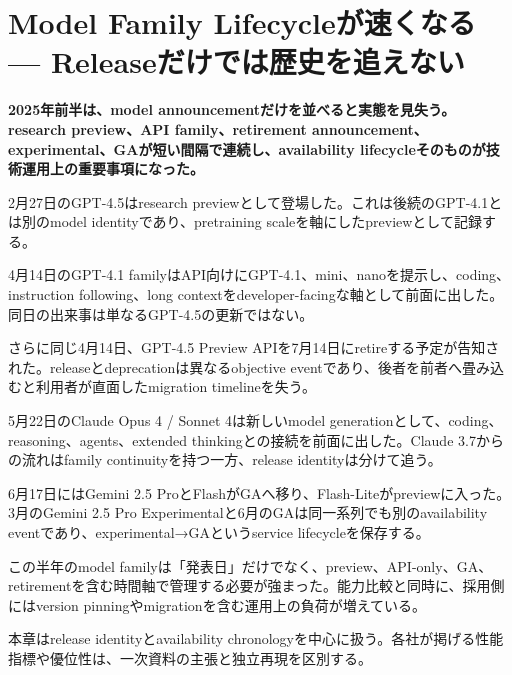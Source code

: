 \section{Model Family Lifecycleが速くなる — Releaseだけでは歴史を追えない}
\label{pkg:lifecycle}
\noindent\textbf{2025年前半は、model announcementだけを並べると実態を見失う。research preview、API family、retirement announcement、experimental、GAが短い間隔で連続し、availability lifecycleそのものが技術運用上の重要事項になった。}\autocite{src-31799a46d8d0,src-3fa7f4cd510b,src-53f15d483a2d}

2月27日のGPT-4.5はresearch previewとして登場した。これは後続のGPT-4.1とは別のmodel identityであり、pretraining scaleを軸にしたpreviewとして記録する。\autocite{src-3fa7f4cd510b}


4月14日のGPT-4.1 familyはAPI向けにGPT-4.1、mini、nanoを提示し、coding、instruction following、long contextをdeveloper-facingな軸として前面に出した。同日の出来事は単なるGPT-4.5の更新ではない。\autocite{src-31799a46d8d0}


さらに同じ4月14日、GPT-4.5 Preview APIを7月14日にretireする予定が告知された。releaseとdeprecationは異なるobjective eventであり、後者を前者へ畳み込むと利用者が直面したmigration timelineを失う。\autocite{src-31799a46d8d0}


5月22日のClaude Opus 4 / Sonnet 4は新しいmodel generationとして、coding、reasoning、agents、extended thinkingとの接続を前面に出した。Claude 3.7からの流れはfamily continuityを持つ一方、release identityは分けて追う。\autocite{src-4ec03078d316}


6月17日にはGemini 2.5 ProとFlashがGAへ移り、Flash-Liteがpreviewに入った。3月のGemini 2.5 Pro Experimentalと6月のGAは同一系列でも別のavailability eventであり、experimental→GAというservice lifecycleを保存する。\autocite{src-53f15d483a2d}


この半年のmodel familyは「発表日」だけでなく、preview、API-only、GA、retirementを含む時間軸で管理する必要が強まった。能力比較と同時に、採用側にはversion pinningやmigrationを含む運用上の負荷が増えている。\autocite{src-31799a46d8d0,src-53f15d483a2d}


\begin{claimboundary}
本章はrelease identityとavailability chronologyを中心に扱う。各社が掲げる性能指標や優位性は、一次資料の主張と独立再現を区別する。
\end{claimboundary}
